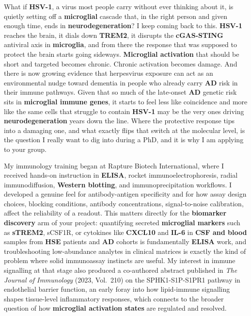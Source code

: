 \documentclass[letterpaper,11pt]{article}
\begin{document}
\vspace{6pt}
What if \textbf{HSV-1}, a virus most people carry without ever thinking about it, is quietly setting off a \textbf{microglial} cascade that, in the right person and given enough time, ends in \textbf{neurodegeneration}? I keep coming back to this. \textbf{HSV-1} reaches the brain, it dials down \textbf{TREM2}, it disrupts the \textbf{cGAS-STING} antiviral axis in \textbf{microglia}, and from there the response that was supposed to protect the brain starts going sideways. \textbf{Microglial activation} that should be short and targeted becomes chronic. Chronic activation becomes damage. And there is now growing evidence that herpesvirus exposure can act as an environmental nudge toward dementia in people who already carry \textbf{AD} risk in their immune pathways. Given that so much of the late-onset \textbf{AD} genetic risk sits in \textbf{microglial immune genes}, it starts to feel less like coincidence and more like the same cells that struggle to contain \textbf{HSV-1} may be the very ones driving \textbf{neurodegeneration} years down the line. Where the protective response tips into a damaging one, and what exactly flips that switch at the molecular level, is the question I really want to dig into during a PhD, and it is why I am applying to your group.

\vspace{6pt}
My immunology training began at Rapture Biotech International, where I received hands-on instruction in \textbf{ELISA}, rocket immunoelectrophoresis, radial immunodiffusion, \textbf{Western blotting}, and immunoprecipitation workflows. I developed a genuine feel for antibody-antigen specificity and for how assay design choices, blocking conditions, antibody concentrations, signal-to-noise calibration, affect the reliability of a readout. This matters directly for the \textbf{biomarker discovery} arm of your project: quantifying secreted \textbf{microglial markers} such as \textbf{sTREM2}, sCSF1R, or cytokines like \textbf{CXCL10} and \textbf{IL-6} in \textbf{CSF and blood} samples from \textbf{HSE} patients and \textbf{AD} cohorts is fundamentally \textbf{ELISA} work, and troubleshooting low-abundance analytes in clinical matrices is exactly the kind of problem where solid immunoassay instincts are useful. My interest in immune signalling at that stage also produced a co-authored abstract published in \textit{The Journal of Immunology} (2023, Vol.\ 210) on the SPHK1-S1P-S1PR1 pathway in endothelial barrier function, an early foray into how lipid-immune signalling shapes tissue-level inflammatory responses, which connects to the broader question of how \textbf{microglial activation states} are regulated and resolved.
\end{document}
